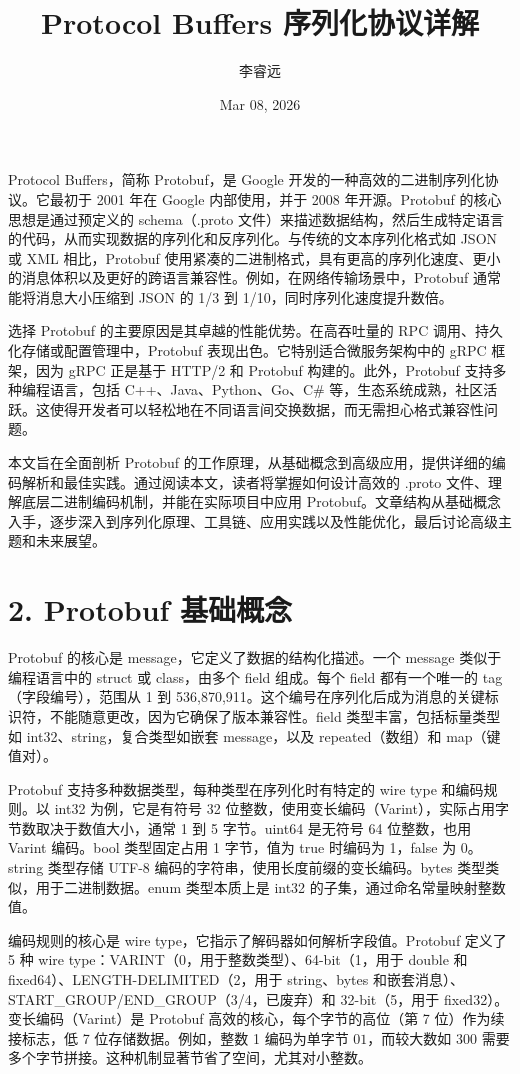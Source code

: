 \title{Protocol Buffers 序列化协议详解}
\author{李睿远}
\date{Mar 08, 2026}
\maketitle
Protocol Buffers，简称 Protobuf，是 Google 开发的一种高效的二进制序列化协议。它最初于 2001 年在 Google 内部使用，并于 2008 年开源。Protobuf 的核心思想是通过预定义的 schema（.proto 文件）来描述数据结构，然后生成特定语言的代码，从而实现数据的序列化和反序列化。与传统的文本序列化格式如 JSON 或 XML 相比，Protobuf 使用紧凑的二进制格式，具有更高的序列化速度、更小的消息体积以及更好的跨语言兼容性。例如，在网络传输场景中，Protobuf 通常能将消息大小压缩到 JSON 的 1/3 到 1/10，同时序列化速度提升数倍。\par
选择 Protobuf 的主要原因是其卓越的性能优势。在高吞吐量的 RPC 调用、持久化存储或配置管理中，Protobuf 表现出色。它特别适合微服务架构中的 gRPC 框架，因为 gRPC 正是基于 HTTP/2 和 Protobuf 构建的。此外，Protobuf 支持多种编程语言，包括 C++、Java、Python、Go、C\#{} 等，生态系统成熟，社区活跃。这使得开发者可以轻松地在不同语言间交换数据，而无需担心格式兼容性问题。\par
本文旨在全面剖析 Protobuf 的工作原理，从基础概念到高级应用，提供详细的编码解析和最佳实践。通过阅读本文，读者将掌握如何设计高效的 .proto 文件、理解底层二进制编码机制，并能在实际项目中应用 Protobuf。文章结构从基础概念入手，逐步深入到序列化原理、工具链、应用实践以及性能优化，最后讨论高级主题和未来展望。\par
\chapter{2. Protobuf 基础概念}
Protobuf 的核心是 message，它定义了数据的结构化描述。一个 message 类似于编程语言中的 struct 或 class，由多个 field 组成。每个 field 都有一个唯一的 tag（字段编号），范围从 1 到 536,870,911。这个编号在序列化后成为消息的关键标识符，不能随意更改，因为它确保了版本兼容性。field 类型丰富，包括标量类型如 int32、string，复合类型如嵌套 message，以及 repeated（数组）和 map（键值对）。\par
Protobuf 支持多种数据类型，每种类型在序列化时有特定的 wire type 和编码规则。以 int32 为例，它是有符号 32 位整数，使用变长编码（Varint），实际占用字节数取决于数值大小，通常 1 到 5 字节。uint64 是无符号 64 位整数，也用 Varint 编码。bool 类型固定占用 1 字节，值为 true 时编码为 1，false 为 0。string 类型存储 UTF-8 编码的字符串，使用长度前缀的变长编码。bytes 类型类似，用于二进制数据。enum 类型本质上是 int32 的子集，通过命名常量映射整数值。\par
编码规则的核心是 wire type，它指示了解码器如何解析字段值。Protobuf 定义了 5 种 wire type：VARINT（0，用于整数类型）、64-bit（1，用于 double 和 fixed64）、LENGTH-DELIMITED（2，用于 string、bytes 和嵌套消息）、START\_{}GROUP/END\_{}GROUP（3/4，已废弃）和 32-bit（5，用于 fixed32）。变长编码（Varint）是 Protobuf 高效的核心，每个字节的高位（第 7 位）作为续接标志，低 7 位存储数据。例如，整数 1 编码为单字节 $01$，而较大数如 300 需要多个字节拼接。这种机制显著节省了空间，尤其对小整数。\par
